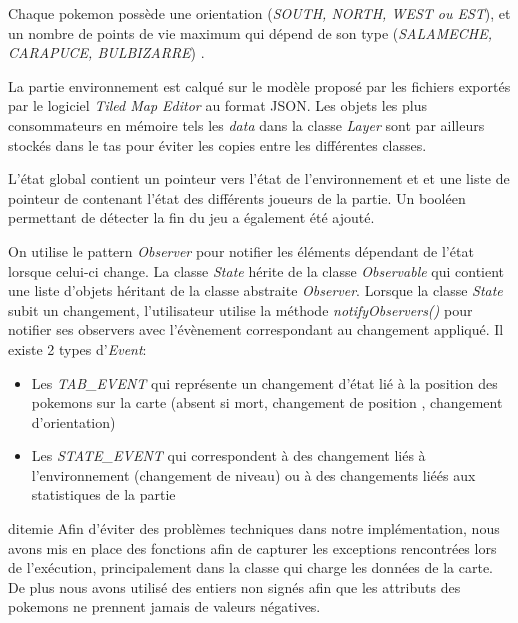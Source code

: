 \documentclass[a4paper,12pt]{article}
\begin{document}
    Chaque pokemon possède une orientation (\emph{SOUTH, NORTH, WEST ou EST}), et un nombre de points de vie maximum qui dépend de son type (\emph{SALAMECHE, CARAPUCE, BULBIZARRE}) .
    
    La partie environnement est calqué sur le modèle proposé par les fichiers exportés par le logiciel \emph{Tiled Map Editor} au format JSON. Les objets les plus consommateurs en mémoire tels les \emph{data} dans la classe \emph{Layer} sont par ailleurs stockés dans le tas pour éviter les copies entre les différentes classes.
    
     L'état global contient un pointeur vers l'état de l'environnement et et une liste de pointeur de contenant l'état des différents joueurs de la partie. Un booléen permettant de détecter la fin du jeu a également été ajouté. 
     
     On utilise le pattern \emph{Observer} pour notifier les éléments dépendant de l'état lorsque celui-ci change. La classe \emph{State} hérite de la classe \emph{Observable} qui contient une liste d'objets héritant de la classe abstraite \emph{Observer}. Lorsque la classe \emph{State} subit un changement, l'utilisateur utilise la méthode \emph{notifyObservers()} pour notifier ses observers avec l'évènement correspondant au changement appliqué.
     Il existe 2 types d'\emph{Event}:
\begin{itemize}
\item Les \emph{TAB\_EVENT} qui représente un changement d'état lié à la position des pokemons sur la carte (absent si mort, changement de position , changement d'orientation)
\item Les \emph{STATE\_EVENT} qui correspondent à des changement liés à l'environnement (changement de niveau) ou à des changements liéés aux statistiques de la partie
\end{itemize}
     d{itemie}
  Afin d'éviter des problèmes techniques dans notre implémentation, nous avons mis en place des fonctions afin de capturer les exceptions rencontrées lors de l'exécution, principalement dans la classe qui charge les données de la carte. De plus nous avons utilisé des entiers non signés afin que les attributs des pokemons ne prennent jamais de valeurs négatives.
    
\end{document}
